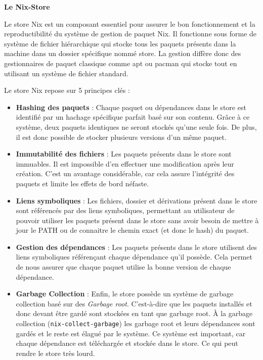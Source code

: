 \documentclass[a4paper,french,12pt, titlepage]{article}
\begin{document}
\textbf{Le Nix-Store}\newline

Le store Nix est un composant essentiel pour assurer le bon
fonctionnement et la reproductibilité du système de gestion de paquet
Nix. Il fonctionne sous forme de système de fichier hiérarchique qui
stocke tous les paquets présents dans la machine dans un dossier
spécifique nommé store. La gestion diffère donc des gestionnaires de
paquet classique comme apt ou pacman qui stocke tout en utilisant un
système de fichier standard.\newline

Le store Nix repose sur 5 principes clés :

\begin{itemize}
\item
  \textbf{Hashing des paquets} : Chaque paquet ou dépendances dans le
  store est identifié par un hachage spécifique parfait basé sur son
  contenu. Grâce à ce système, deux paquets identiques ne seront stockés
  qu'une seule fois. De plus, il est donc possible de stocker plusieurs
  versions d'un même paquet.
\item
  \textbf{Immutabilité des fichiers} : Les paquets présents dans le
  store sont immuables. Il est impossible d'en effectuer une
  modification après leur création. C'est un avantage considérable, car
  cela assure l'intégrité des paquets et limite les effets de bord
  néfaste.
\item
  \textbf{Liens symboliques} : Les fichiers, dossier et dérivations
  présent dans le store sont référencés par des liens symboliques,
  permettant au utilisateur de pouvoir utiliser les paquets présent dans
  le store sans avoir besoin de mettre à jour le PATH ou de connaitre le
  chemin exact (et donc le hash) du paquet.
\item
  \textbf{Gestion des dépendances} : Les paquets présents dans le store
  utilisent des liens symboliques référençant chaque dépendance qu'il
  possède. Cela permet de nous assurer que chaque paquet utilise la
  bonne version de chaque dépendance.
\item
  \textbf{Garbage Collection} : Enfin, le store possède un système de
  garbage collection basé sur des \emph{Garbage root}. C'est-à-dire que
  les paquets installés et donc devant être gardé sont stockées en tant
  que garbage root. À la garbage collection
  (\texttt{nix-collect-garbage}) les garbage root et leurs dépendances
  sont gardés et le reste est élagué par le système. Ce système est
  important, car chaque dépendance est téléchargée et stockée dans le
  store. Ce qui peut rendre le store très lourd.\newline
\end{itemize}
\end{document}
